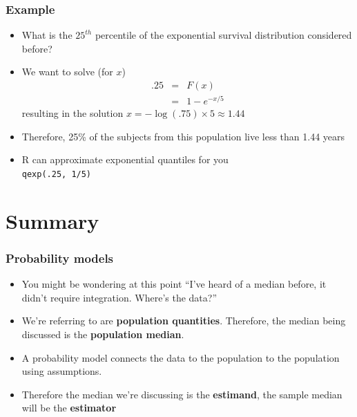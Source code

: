\documentclass[aspectratio=169]{beamer}
\begin{document}
\begin{frame}
\frametitle{Example}
\begin{itemize}
\item  What is the $25^{th}$ percentile of the exponential survival distribution considered before?
\item We want to solve (for $x$)
\begin{eqnarray*}
.25 & = & F(x) \\  
    & = & 1 - e^{-x/5}
\end{eqnarray*}
resulting in the solution $x = -\log(.75) \times 5 \approx 1.44$
\item Therefore, 25\% of the
subjects from this population live less than 1.44 years
\item R can approximate exponential quantiles for you \\
\texttt{qexp(.25, 1/5)}
\end{itemize}
\end{frame}


\section{Summary}
\begin{frame}
\frametitle{Probability models}
\begin{itemize}
\item You might be wondering at this point ``I've heard of a median before, it didn't require integration. Where's the data?''
\item We're referring to are {\bf population quantities}. Therefore, the median being
	discussed is the {\bf population median}.
\item A probability model connects the data to the population to the population using assumptions.
\item Therefore the median we're discussing is the {\bf estimand}, the sample median will be the {\bf estimator}
\end{itemize}
\end{frame}
\end{document}
